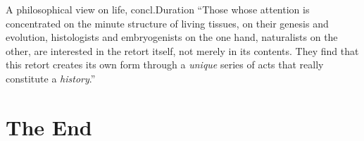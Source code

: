 \begin{frame}{A philosophical view on life, concl.}{Duration}
``Those whose attention is concentrated on the minute structure of living tissues, on their genesis and evolution, histologists and embryogenists on the one hand, naturalists on the other, are interested in the retort itself, not merely in its contents. They find that this retort creates its own form through a \emph{unique} series of acts that really constitute a \emph{history}.''\quad {}
\end{frame}

\part{The End}
\frame{\partpage}

